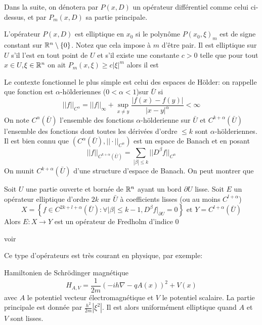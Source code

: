 \documentclass[memoire.tex]{subfiles}
\begin{document}
Dans la suite, on dénotera par $P(x,D)$ un opérateur différentiel comme celui ci-dessus, et par $P_m(x,D)$ sa partie principale.
\begin{definition}
    L'opérateur $P(x,D)$  est \coldef
    {elliptique } en $x_0$ si le polynôme $P(x_0,\xi)_m$ est 
    de signe constant sur $\mathbb{R}^n\setminus\left\{0\right\}$. Notez que cela impose à $m$ d'être pair. Il est elliptique sur $U$ s'il l'est en tout point de $U$ et 
    s'il existe une constante $c>0$ telle que 
    pour tout $x\in U$,$\xi\in\mathbb{R}^n$ on ait $P_m(x,\xi)\geq 
    c |\xi|^m$ alors il est  
\end{definition}
Le contexte fonctionnel le plus simple est celui des espaces de Hölder: on rappelle que fonction est $\alpha$-hölderiennes ($0<\alpha<1$)sur $\bar{U}$ si
\begin{equation*}
    ||f||_{C^{\alpha}}=||f||_{\infty}+\sup_{x\neq y}\frac{|f(x)-f(y)|}{|x-y|^{\alpha}}<\infty
\end{equation*}
On note $C^{\alpha}(\bar{U})$ l'ensemble des fonctions $\alpha$-hölderienne sur $\bar{U}$ et $C^{k+\alpha}(\bar{U})$ l'ensemble des fonctions dont toutes les dérivées d'ordre $\leq k$ sont $\alpha$-hölderiennes.  Il est bien connu que $(C^\alpha(\bar{U}),||\cdot||_{C^{\alpha}})$ est un espace de Banach et en posant
\begin{equation*}
    ||f||_{C^{k+\alpha}(\bar{U})}=\sum_{|\beta|\leq k}||D^\beta f||_{C^\alpha}
\end{equation*}
On munit $C^{k+\alpha}(\bar{U})$ d'une structure d'espace de Banach. On peut montrer que
\begin{proposition}
    Soit $U$ une partie ouverte et bornée de $\mathbb{R}^n$ ayant un bord $\partial U$ lisse. Soit $E$ un opérateur elliptique d'ordre $2k$ sur $\bar{U}$ à coefficients lisses (ou au moins $C^{l+\alpha}$)
    \begin{equation*}
        X=\left\{ f\in C^{2k+l+\alpha}(\bar{U}):\forall |\beta|\leq k-1, D^{\beta}f|_{\partial U}=0\right\}\text{ et } Y=C^{l+\alpha}(\bar{U})
    \end{equation*}
    Alors $E: X\rightarrow Y$ est un opérateur de Fredholm d'indice 0
\end{proposition}
\begin{preuve}
    voir \cite{berger1977nonlinearity}
\end{preuve}
Ce type d'opérateurs est très courant en physique, par exemple:
\begin{exemple}
    Hamiltonien de Schrödinger magnétique
    \begin{equation*}
        H_{A,V}=\frac{1}{2m}(-ih\nabla - qA(x))^2+V(x)
    \end{equation*}
    avec $A$ le potentiel vecteur électromagnétique et $V$ le potentiel scalaire. La partie principale est donnée par $\frac{h^2}{2m}|\xi^2|$. Il est alors uniformément elliptique quand $A$ et $V$ sont lisses.
\end{exemple}
\end{document}
